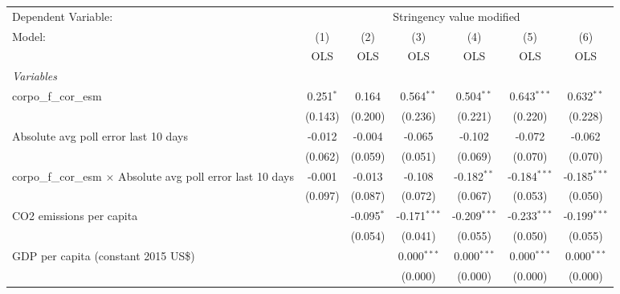 
\begingroup
\centering
\begin{tabular}{lcccccc}
   \toprule
   Dependent Variable: & \multicolumn{6}{c}{Stringency value modified}\\
   Model:                                                               & (1)         & (2)          & (3)            & (4)            & (5)            & (6)\\  
                                                                        &  OLS        & OLS          & OLS            & OLS            & OLS            & OLS\\  
   \midrule
   \emph{Variables}\\
   corpo\_f\_cor\_esm                                                   & 0.251$^{*}$ & 0.164        & 0.564$^{**}$   & 0.504$^{**}$   & 0.643$^{***}$  & 0.632$^{**}$\\   
                                                                        & (0.143)     & (0.200)      & (0.236)        & (0.221)        & (0.220)        & (0.228)\\   
   Absolute avg poll error last 10 days                                 & -0.012      & -0.004       & -0.065         & -0.102         & -0.072         & -0.062\\   
                                                                        & (0.062)     & (0.059)      & (0.051)        & (0.069)        & (0.070)        & (0.070)\\   
   corpo\_f\_cor\_esm $\times$ Absolute avg poll error last 10 days     & -0.001      & -0.013       & -0.108         & -0.182$^{**}$  & -0.184$^{***}$ & -0.185$^{***}$\\   
                                                                        & (0.097)     & (0.087)      & (0.072)        & (0.067)        & (0.053)        & (0.050)\\   
   CO2 emissions per capita                                             &             & -0.095$^{*}$ & -0.171$^{***}$ & -0.209$^{***}$ & -0.233$^{***}$ & -0.199$^{***}$\\   
                                                                        &             & (0.054)      & (0.041)        & (0.055)        & (0.050)        & (0.055)\\   
   GDP per capita (constant 2015 US\$)                                  &             &              & 0.000$^{***}$  & 0.000$^{***}$  & 0.000$^{***}$  & 0.000$^{***}$\\   
                                                                        &             &              & (0.000)        & (0.000)        & (0.000)        & (0.000)\\   

\end{tabular}

